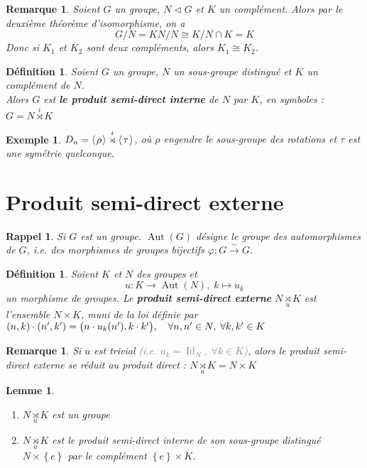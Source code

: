 \documentclass[a4paper, oneside]{report}
\theoremstyle{break}
\newtheorem{lemme}[thm]{Lemme}
\newtheorem{definition}[thm]{Définition}
\newtheorem*{rappel}{Rappel}
\newtheorem{exemple}[thm]{Exemple}
\newtheorem{remarque}[thm]{Remarque}
\newcommand{\gray}[1]{\textcolor{gray}{#1}}
\newcommand{\fong}{\overset{\sim}{\rightarrow}}
\DeclarePairedDelimiter\ens{\left\{ }{\right\} }%
\DeclarePairedDelimiter\pa{\big(}{\big)}%
\DeclareMathOperator{\Aut}{Aut}
\DeclareMathOperator{\Id}{Id}
\renewcommand{\ens}[1]{\left\{ #1 \right\} }%
\newcommand{\pro}[1]{\langle\hspace{0.1em}#1\hspace{0.1em}\rangle}
\newcommand{\slign}{\textbf}
\newcommand{\us}{\underset}
\newcommand{\os}{\overset}
\newcommand{\gen}{\pro}
\begin{document}
\begin{remarque}
Soient $G$ un groupe, $N \triangleleft G$ et $K$ un complément. Alors par le deuxième théorème d'isomorphisme, on a
\[
G / N = KN \big/ N \cong K \big/ N \cap K = K
\]
Donc si $K_1$ et $K_2$ sont deux compléments, alors $K_1 \cong K_2$.
\end{remarque}

\begin{definition}
Soient $G$ un groupe, $N$ un sous-groupe distingué et $K$ un complément de $N$.\\
Alors $G$ est \slign{le produit semi-direct interne} de $N$ par $K$, en symboles : $G = N \os{i}{\rtimes} K$
\end{definition}

\begin{exemple}
$D_n = \gen{\rho} \os{i}{\rtimes} \gen{\tau}$, où $\rho$ engendre le sous-groupe des rotations et $\tau$ est une symétrie quelconque.
\end{exemple}

\section{Produit semi-direct externe}

\begin{rappel}
Si $G$ est un groupe. $\Aut(G)$ désigne le groupe des automorphismes de $G$, i.e. des morphismes de groupes bijectifs $\varphi : G \fong G$.
\end{rappel}



\begin{definition}
Soient $K$ et $N$ des groupes et 
\[
u : K \rightarrow \Aut(N), \; k \mapsto u_k
\]
un morphisme de groupes. Le \slign{produit semi-direct externe} $N \us{u}{\rtimes} K$ est l'ensemble $N \times K$, muni de la loi définie par $(n, k) \cdot (n', k') = \pa{n \cdot u_k(n'), k \cdot k'},	\quad	\forall n, n' \in N, \; \forall k, k' \in K$
\end{definition}

\begin{remarque}
Si $u$ est trivial \gray{(i.e. $u_k = \Id_N, \; \forall k \in K$)}, alors le produit semi-direct externe se réduit au produit direct : $N \us{u}{\rtimes} K = N \times K$
\end{remarque}

\begin{lemme}
\begin{enumerate}
\item  $N \us{u}{\rtimes} K$ est un groupe

\medbreak

\item  $N \us{u}{\rtimes} K$ est le produit semi-direct interne de son sous-groupe distingué $N \times \ens{e}$ par le complément $\ens{e} \times K$.

\end{enumerate}
\end{lemme}
\end{document}
